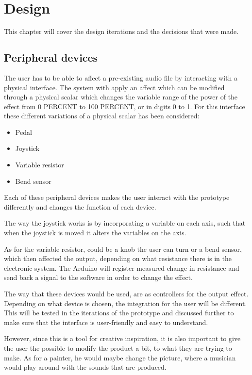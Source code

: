 \chapter{Design}\label{ch:design}
This chapter will cover the design iterations and the decisions that were made. 


\section{Peripheral devices}
The user has to be able to affect a pre-existing audio file by interacting with a physical interface. The system with apply an affect which can be modified through a physical scalar which changes the variable range of the power of the effect from 0 PERCENT to 100 PERCENT, or in digits 0 to 1. For this interface these different variations of a physical scalar has been considered: 

\begin{itemize}
\item Pedal
\item Joystick
\item Variable resistor
\item Bend sensor
\end{itemize}



Each of these peripheral devices makes the user interact with the prototype differently and changes the function of each device. 

The way the joystick works is by incorporating a variable on each axis, such that when the joystick is moved it alters the variables on the axis. 

As for the variable resistor, could be a knob the user can turn or a bend sensor, which then affected the output, depending on what resistance there is in the electronic system. The Arduino will register measured change in resistance and send back a signal to the software in order to change the effect.

The way that these devices would be used, are as controllers for the output effect. Depending on what device is chosen, the integration for the user will be different. This will be tested in the iterations of the prototype and discussed further to make sure that the interface is user-friendly and easy to understand. 

However, since this is a tool for creative inspiration, it is also important to give the user the possible to modify the product a bit, to what they are trying to make. As for a painter, he would maybe change the picture, where a musician would play around with the sounds that are produced. 